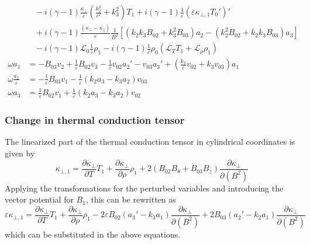 \documentclass[11pt, fleqn]{article}
\newcommand{\HL}{\mathscr{L}}
\newcommand{\eps}{\varepsilon}
\begin{document}
\begin{equation}
\begin{aligned}
										&~~~~ - i(\gamma - 1)\frac{\kappa_\bot}{\eps}\left(\frac{k_2^2}{\eps^2} + k_3^2\right)T_1 + i(\gamma - 1)\frac{1}{\eps}\left(\eps\kappa_{\bot, 1}T_0'\right)'						\\
										&~~~~ + i(\gamma - 1)\frac{(\kappa_\bot - \kappa_\parallel)}{\eps}\frac{1}{B^2}\left[\left(k_2k_3B_{02} + k_3^2B_{03}\right)a_2 - \left(k_2^2B_{02} + k_2k_3B_{03}\right)a_3\right]	\\
										&~~~~ - i(\gamma - 1)\HL_0\frac{1}{\eps}\rho_1 - i(\gamma - 1)\frac{1}{\eps}\rho_0\left(\HL_T T_1 + \HL_\rho\rho_1\right)															\\[8pt]
		\omega a_1						&= -B_{03}v_2 + \frac{1}{\eps}B_{02}v_3 - \frac{1}{\eps}v_{02}a_2' - v_{03}a_3' + \left(\frac{k_2}{\eps}v_{02} + k_3v_{03}\right)a_1												\\[8pt]
		\omega \frac{a_2}{\eps}			&= -\frac{1}{\eps}B_{03}v_1 - \frac{1}{\eps}\left(k_2a_3 -k_3a_2\right)v_{03}																										\\[8pt]
		\omega a_3						&= \frac{1}{\eps}B_{02}v_1 + \frac{1}{\eps}\left(k_2a_3 - k_3a_2\right)v_{02}																				
	\end{aligned}
\end{equation}

\newpage
\subsubsection{Change in thermal conduction tensor}
The linearized part of the thermal conduction tensor in cylindrical coordinates is given by
\begin{equation}
	\kappa_{\bot, 1} = \frac{\partial \kappa_\bot}{\partial T}T_1 + \frac{\partial \kappa_\bot}{\partial \rho}\rho_1 + 2\left(B_{02}B_\theta + B_{03}B_z\right)\frac{\partial \kappa_\bot}{\partial(B^2)}
\end{equation}
Applying the transformations for the perturbed variables and introducing the vector potential for $B_1$, this can be rewritten as
\begin{equation}
	\eps\kappa_{\bot, 1} = \frac{\partial \kappa_\bot}{\partial T}T_1 + \frac{\partial \kappa_\bot}{\partial \rho}\rho_1 - 2\eps B_{02}\left(a_3' - k_3a_1\right)\frac{\partial \kappa_\bot}{\partial (B^2)}
											+ 2B_{03}\left(a_2' - k_2a_1\right)\frac{\partial \kappa_\bot}{\partial (B^2)}
\end{equation}
which can be substituted in the above equations.
\end{document}
